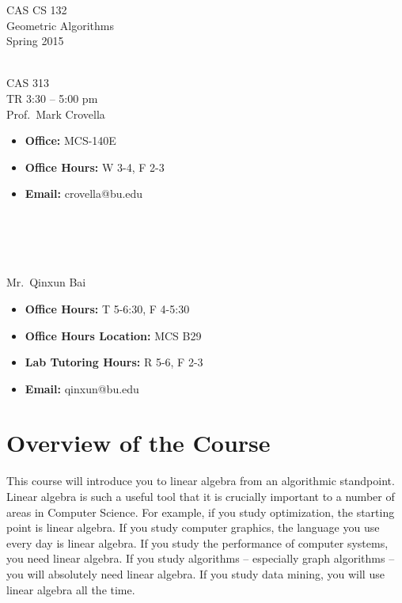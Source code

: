 \documentclass[11pt]{article}
\begin{document}
\sloppy 
\begin{center}
\LARGE CAS CS 132\\
\Large Geometric Algorithms\\
\Large\rm Spring 2015\\~\\
\end{center}

 CAS 313\\[\baselineskip]
 TR 3:30 -- 5:00 pm 
\\[\baselineskip] 

 Prof.\ Mark Crovella\\[0.75\baselineskip]
\begin{minipage}[t]{0.60\textwidth}
\begin{itemize}
\item {\bf Office:} MCS-140E
\item {\bf Office Hours:} {\small W 3-4,  F 2-3}
\item {\bf Email:} crovella@bu.edu
\end{itemize}
\end{minipage}
~\\~\\~\\~\\
  Mr.\ Qinxun Bai\\[0.75\baselineskip]
 \begin{minipage}[t]{0.60\textwidth}
 \begin{itemize}
 \item {\bf Office Hours:} {\small T 5-6:30, F 4-5:30}
 \item {\bf Office Hours Location:} MCS B29 
 \item {\bf Lab Tutoring Hours:} {\small R 5-6, F 2-3}
 \item {\bf Email:} qinxun@bu.edu
 \end{itemize}
 \end{minipage}

\section*{Overview of the Course}

This course will introduce you to linear algebra from an algorithmic
standpoint.  Linear algebra is such a useful tool that it is crucially
important to a number of areas in Computer Science. For example, if you study
optimization, the starting point is linear algebra. If you study
computer graphics, the language you use every day is linear algebra. If
you study the performance of computer systems, you need linear
algebra. If you study algorithms -- especially graph algorithms -- you
will absolutely need linear algebra. If you study data mining, you will
use linear algebra all the time. 
\end{document}
